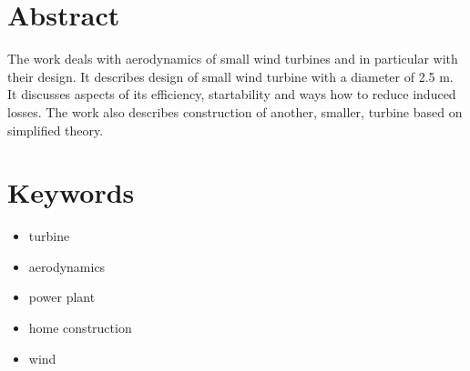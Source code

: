\begin{otherlanguage}{english}

\section*{Abstract}\label{AbstraktEN}

\begin{spacing}{1.3}
	The work deals with aerodynamics of small wind turbines and in particular with their design. It describes design of small wind turbine with a diameter of 2.5 m. It discusses aspects of its efficiency, startability and ways how to reduce induced losses.
	The work also describes construction of another, smaller, turbine based on simplified theory.

\end{spacing}

\section*{Keywords}

\begin{itemize}
	\item turbine
	\item aerodynamics
	\item power plant
	\item home construction
	\item wind
\end{itemize}

\end{otherlanguage}

\renewcommand{\labelitemi}{\textbullet}
